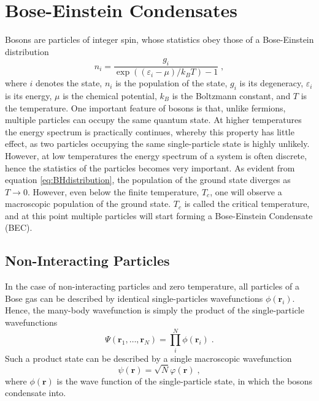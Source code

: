 \chapter{Bose-Einstein Condensates}

Bosons are particles of integer spin, whose statistics obey those of a Bose-Einstein distribution
\begin{equation}
	n_i = \frac{g_i}{\exp \left( \left( \varepsilon_i -\mu \right) / k_B T \right) - 1} \; , \label{eq:BHdistribution}
\end{equation} 
where $i$ denotes the state, $n_i$ is the population of the state, $g_i$ is its degeneracy, $\varepsilon_i$ is its energy, $\mu$ is the chemical potential, $k_B$ is the Boltzmann constant, and $T$ is the temperature. One important feature of bosons is that, unlike fermions, multiple particles can occupy the same quantum state. At higher temperatures the energy spectrum is practically continues, whereby this property has little effect, as two particles occupying the same single-particle state is highly unlikely. However, at low temperatures the energy spectrum of a system is often discrete, hence the statistics of the particles becomes very important. As evident from equation \ref{eq:BHdistribution}, the population of the ground state diverges as $T \to 0$. However, even below the finite temperature, $T_c$, one will observe a macroscopic population of the ground state. $T_c$ is called the critical temperature, and at this point multiple particles will start forming a Bose-Einstein Condensate (BEC). \cite{pethick2002bose}

\section{Non-Interacting Particles}
In the case of non-interacting particles and zero temperature, all particles of a Bose gas can be described by identical single-particles wavefunctions $\phi (\boldsymbol{r}_i)$. Hence, the many-body wavefunction is simply the product of the single-particle wavefunctions 
\begin{equation}
	\Psi (\boldsymbol{r}_1 , \ldots , \boldsymbol{r}_N) = \prod_{i}^{N} \phi (\boldsymbol{r}_i) \; .
\end{equation}
Such a product state can be described by a single macroscopic wavefunction \cite{PenroseOnsager}
\begin{equation}
	\psi (\boldsymbol{r}) = \sqrt{N} \varphi (\boldsymbol{r}) \; , \label{eq:psi_NIBEC}
\end{equation}
where $\phi (\boldsymbol{r})$ is the wave function of the single-particle state, in which the bosons condensate into.


